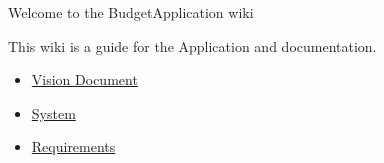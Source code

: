 \hypertarget{welcome-to-the-budgetapplication-wiki}{%
\large{Welcome to the BudgetApplication
wiki}}
\label{welcome-to-the-budgetapplication-wiki}

This wiki is a guide for the Application and documentation.

\begin{itemize}
\item
    \href{/Vision Document}{Vision Document}
\item
  \href{/System}{System}
\item
  \href{/Requirements}{Requirements}
\end{itemize}
